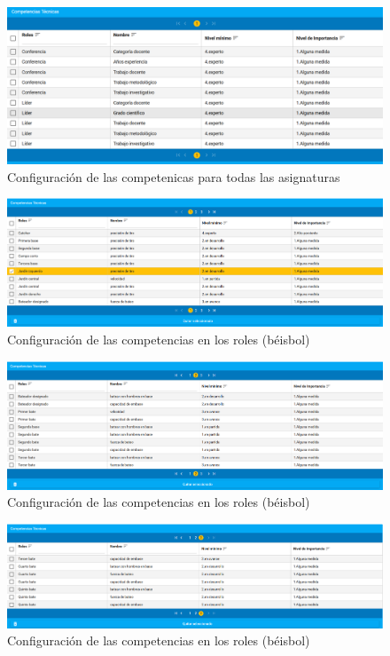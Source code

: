 {\begin{figure}[H]
	\centering
	\includegraphics[width=\textwidth]{figuras/conf-roles-comp-asignatura.png}
	\caption{Configuración de las competenicas para todas las asignaturas} \label{fig:conf-roles-comp-asignatura}
\end{figure}

\begin{figure}[H]
	\centering
	\includegraphics[width=\textwidth]{figuras/beisbol_conf_comp_rol1.png}
	\caption{Configuración de las competencias en los roles (béisbol)} \label{fig:conf-roles-comp-pelota}
\end{figure}

\begin{figure}[H]
	\centering
	\includegraphics[width=\textwidth]{figuras/beisbol_conf_comp_rol2.png}
	\caption{Configuración de las competencias en los roles (béisbol)} \label{fig:conf-roles-comp-pelota1}
\end{figure}

\begin{figure}[H]
	\centering
	\includegraphics[width=\textwidth]{figuras/beisbol_conf_comp_rol3.png}
	\caption{Configuración de las competencias en los roles (béisbol)} \label{fig:conf-roles-comp-pelota2}
\end{figure}


}
